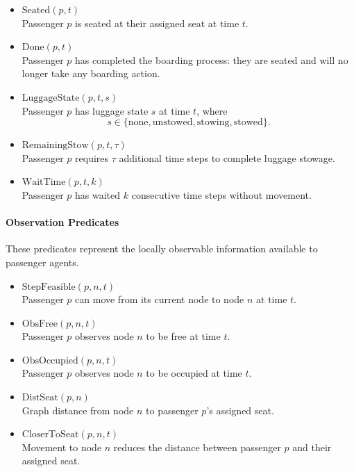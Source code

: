 \documentclass[11pt,a4paper]{article}
\begin{document}
\begin{itemize}

\item $\text{Seated}(p,t)$\\
Passenger $p$ is seated at their assigned seat at time $t$.

\item $\text{Done}(p,t)$\\
Passenger $p$ has completed the boarding process: they are seated and will no longer take any boarding action.

\item $\text{LuggageState}(p,t,s)$\\
Passenger $p$ has luggage state $s$ at time $t$, where
\[
s \in \{\text{none}, \text{unstowed}, \text{stowing}, \text{stowed}\}.
\]

\item $\text{RemainingStow}(p,t,\tau)$\\
Passenger $p$ requires $\tau$ additional time steps to complete luggage stowage.

\item $\text{WaitTime}(p,t,k)$\\
Passenger $p$ has waited $k$ consecutive time steps without movement.

\end{itemize}

\paragraph{Observation Predicates}

These predicates represent the locally observable information available to passenger agents.

\begin{itemize}

\item $\text{StepFeasible}(p,n,t)$\\
Passenger $p$ can move from its current node to node $n$ at time $t$.

\item $\text{ObsFree}(p,n,t)$\\
Passenger $p$ observes node $n$ to be free at time $t$.

\item $\text{ObsOccupied}(p,n,t)$\\
Passenger $p$ observes node $n$ to be occupied at time $t$.

\item $\text{DistSeat}(p,n)$\\
Graph distance from node $n$ to passenger $p$'s assigned seat.

\item $\text{CloserToSeat}(p,n,t)$\\
Movement to node $n$ reduces the distance between passenger $p$ and their assigned seat.

\end{itemize}
\end{document}
